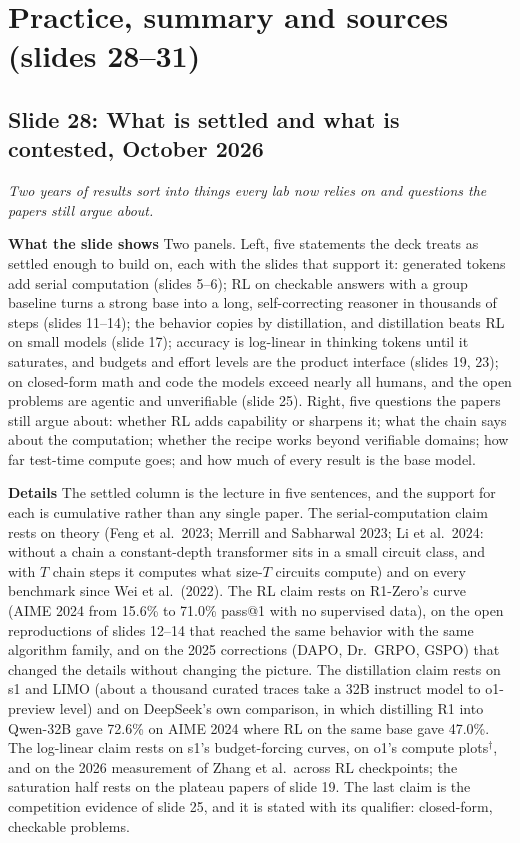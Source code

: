 \documentclass[11pt,letterpaper]{article}
\newcommand{\slide}[3]{%
  \subsection[Slide #1: #2]{Slide #1: #2}%
  {\color{muted}\itshape #3\par}\medskip}
\newcommand{\para}[1]{\medskip\noindent\textbf{#1}\quad}
\begin{document}
\section{Practice, summary and sources (slides 28--31)}

\slide{28}{What is settled and what is contested, October 2026}{Two years of results sort into things every lab now relies on and questions the papers still argue about.}

\para{What the slide shows} Two panels. Left, five statements the deck treats as settled enough to build on, each with the slides that support it: generated tokens add serial computation (slides 5--6); RL on checkable answers with a group baseline turns a strong base into a long, self-correcting reasoner in thousands of steps (slides 11--14); the behavior copies by distillation, and distillation beats RL on small models (slide 17); accuracy is log-linear in thinking tokens until it saturates, and budgets and effort levels are the product interface (slides 19, 23); on closed-form math and code the models exceed nearly all humans, and the open problems are agentic and unverifiable (slide 25). Right, five questions the papers still argue about: whether RL adds capability or sharpens it; what the chain says about the computation; whether the recipe works beyond verifiable domains; how far test-time compute goes; and how much of every result is the base model.

\para{Details} The settled column is the lecture in five sentences, and the support for each is cumulative rather than any single paper. The serial-computation claim rests on theory (Feng et al.\ 2023; Merrill and Sabharwal 2023; Li et al.\ 2024: without a chain a constant-depth transformer sits in a small circuit class, and with $T$ chain steps it computes what size-$T$ circuits compute) and on every benchmark since Wei et al.\ (2022). The RL claim rests on R1-Zero's curve (AIME 2024 from 15.6\% to 71.0\% pass@1 with no supervised data), on the open reproductions of slides 12--14 that reached the same behavior with the same algorithm family, and on the 2025 corrections (DAPO, Dr.\ GRPO, GSPO) that changed the details without changing the picture. The distillation claim rests on s1 and LIMO (about a thousand curated traces take a 32B instruct model to o1-preview level) and on DeepSeek's own comparison, in which distilling R1 into Qwen-32B gave 72.6\% on AIME 2024 where RL on the same base gave 47.0\%. The log-linear claim rests on s1's budget-forcing curves, on o1's compute plots$^\dagger$, and on the 2026 measurement of Zhang et al.\ across RL checkpoints; the saturation half rests on the plateau papers of slide 19. The last claim is the competition evidence of slide 25, and it is stated with its qualifier: closed-form, checkable problems.
\end{document}
